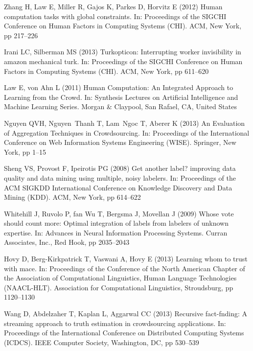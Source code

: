 \documentclass[11pt]{bmc_article_s50}
\begin{document}
\begin{thebibliography}{000}
Zhang H,
Law E,
Miller R,
Gajos K,
Parkes D,
Horvitz E (2012)
{Human computation tasks with global constraints}.
In: {Proceedings of the SIGCHI Conference on Human Factors in Computing
  Systems (CHI)}.
{ACM},
{New York}, pp 217--{226}

Irani LC,
Silberman MS (2013)
{Turkopticon: Interrupting worker invisibility in amazon mechanical
  turk}.
In: {Proceedings of the SIGCHI Conference on Human Factors in Computing
  Systems (CHI)}.
{ACM},
{New York}, pp 611--{620}

Law E,
von Ahn L (2011)
{Human Computation: An Integrated Approach to Learning from the Crowd}.
In: {Synthesis Lectures on Artificial Intelligence and Machine Learning
  Series}.
{Morgan \& Claypool},
{San Rafael, CA, United States}



Nguyen QVH,
Nguyen~Thanh T,
Lam~Ngoc T,
Aberer K (2013)
{An {E}valuation of {A}ggregation {T}echniques in {C}rowdsourcing}.
In: {Proceedings of the International Conference on Web Information Systems Engineering (WISE)}.
{Springer},
{New York},
pp 1--{15}



Sheng VS,
Provost F,
Ipeirotis PG (2008)
{Get another label? improving data quality and data mining using
  multiple, noisy labelers}.
In: {Proceedings of the ACM SIGKDD International Conference on Knowledge Discovery and Data Mining (KDD)}.
{ACM},
{New York},
pp 614--{622}

Whitehill J,
Ruvolo P,
fan Wu T,
Bergsma J,
Movellan J (2009)
{Whose vote should count more: Optimal integration of labels from
  labelers of unknown expertise}.
In: {Advances in Neural Information Processing Systems}.
{Curran Associates, Inc.},
{Red Hook}, pp 2035--{2043}



Hovy D,
Berg-Kirkpatrick T,
Vaswani A,
Hovy E (2013)
{Learning whom to trust with mace}.
In: {Proceedings of the Conference of the North American Chapter of the Association of Computational Linguistics, Human Language Technologies (NAACL-HLT)}.
{Association for Computational Linguistics},
{Stroudsburg},
pp 1120--{1130}



Wang D,
Abdelzaher T,
Kaplan L,
Aggarwal CC (2013)
{Recursive fact-fnding: A streaming approach to truth estimation in
  crowdsourcing applications}.
In: {Proceedings of the International Conference on Distributed
  Computing Systems (ICDCS)}.
{IEEE Computer Society},
{Washington, DC},
pp 530--{539}



\end{thebibliography}
\end{document}
